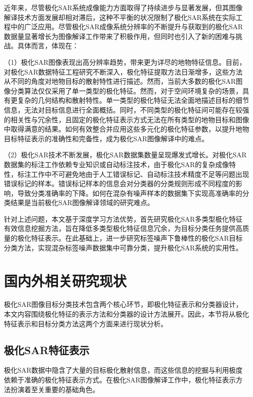近年来，尽管极化SAR系统成像能力方面取得了持续进步与显著发展，但其图像解译技术方面发展却相对滞后，这种不平衡的状况限制了极化SAR系统在实际工程中的广泛应用。尽管极化SAR成像系统分辨率的不断提升与获取到的极化SAR数据量显著增长为图像解译工作带来了积极作用，但同时也引入了新的困难与挑战。具体而言，体现在：

（1）极化SAR图像表现出高分辨率趋势，带来更为详尽的地物特征信息。目前，对极化SAR数据特征工程研究不断深入，极化特征提取方法日渐增多，这些方法从不同的角度对地物目标的散射特性进行描述。然而，当前大多数的极化SAR图像分类算法仅仅采用了单一类型的极化特征。然而，对于空间环境复杂的场景，具有更复杂的几何结构和散射特性。单一类型的极化特征无法全面地描述目标的细节信息，无法对目标信息进行全面概括。同时，不同类型的极化特征间可能存在较强的相关性与冗余性，且固定的极化特征表示方式无法在所有类型的地物目标和图像中取得满意的结果。如何有效整合并应用这些多元化的极化特征参数，以提升地物目标特征表示的准确性和完备性，成为极化SAR图像解译中的难点。

（2）极化SAR技术不断发展，极化SAR数据集数量呈现爆发式增长。对极化SAR数据集的标注工作依赖专业知识或自动标注技术，由于极化SAR的复杂成像特性，标注工作中不可避免地由于人工错误标记、自动标注技术精度不足等问题出现错误标记的样本。错误标记样本的信息会对分类器的分类规则形成不同程度的影响，导致分类准确率的下降。如何在混杂有噪声样本的数据集下实现高准确率的分类结果是当前极化SAR图像解译领域的研究难点。

针对上述问题，本文基于深度学习方法优势，首先研究极化SAR多类型极化特征有效信息挖掘方法，旨在降低多类型极化特征信息冗余，为目标分类任务提供高质量的极化特征表示。在此基础上，进一步研究标签噪声下鲁棒性的极化SAR目标分类方法，实现混杂标签噪声数据集中可靠分类，提升极化SAR系统的实用性。

\section{国内外相关研究现状}
极化SAR图像目标分类技术包含两个核心环节，即极化特征表示和分类器设计，本文内容围绕极化特征的表示方法和分类器的设计方法展开。因此，本节将从极化特征表示和目标分类方法这两个方面来进行现状分析。

\subsection{极化SAR特征表示}
极化SAR数据中隐含了大量的目标极化散射信息，而这些信息的挖掘与利用极度依赖于准确的极化特征表示方式。在极化SAR图像解译工作中，极化特征表示方法扮演着至关重要的基础角色。

